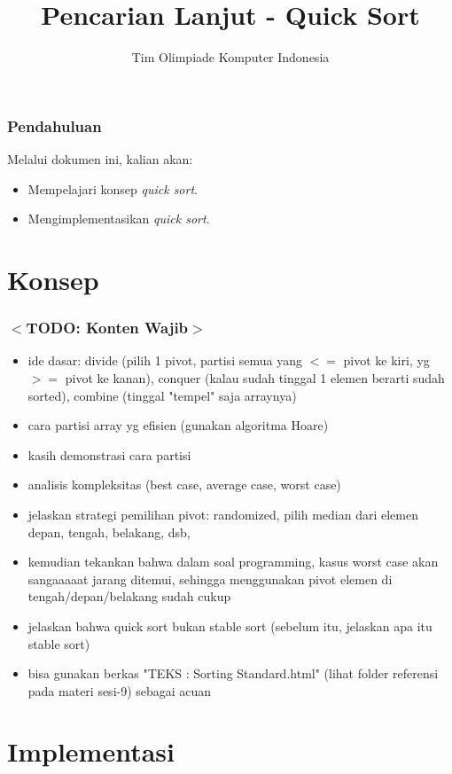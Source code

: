 \documentclass{beamer}
\title{Pencarian Lanjut - Quick Sort}
\author{Tim Olimpiade Komputer Indonesia}
\begin{document}
\begin{frame}
\titlepage
\end{frame}

\begin{frame}
\frametitle{Pendahuluan}
Melalui dokumen ini, kalian akan:
\begin{itemize}
	\item Mempelajari konsep \textit{quick sort}.
	\item Mengimplementasikan \textit{quick sort}.
\end{itemize}
\end{frame}

\section{Konsep}
\frame{\sectionpage}

\begin{frame}
\frametitle{$<$TODO: Konten Wajib$>$}
\begin{itemize}
	\item ide dasar: divide (pilih 1 pivot, partisi semua yang $<=$ pivot ke kiri, yg $>=$ pivot ke kanan), conquer (kalau sudah tinggal 1 elemen berarti sudah sorted), combine (tinggal "tempel" saja arraynya)
	\item cara partisi array yg efisien (gunakan algoritma Hoare)
	\item kasih demonstrasi cara partisi
	\item analisis kompleksitas (best case, average case, worst case)
	\item jelaskan strategi pemilihan pivot: randomized, pilih median dari elemen {depan, tengah, belakang}, dsb,
	\item kemudian tekankan bahwa dalam soal programming, kasus worst case akan sangaaaaat jarang ditemui, sehingga menggunakan pivot elemen di tengah/depan/belakang sudah cukup
	\item jelaskan bahwa quick sort bukan stable sort (sebelum itu, jelaskan apa itu stable sort)
	\item bisa gunakan berkas "TEKS : Sorting Standard.html" (lihat folder referensi pada materi sesi-9) sebagai acuan
\end{itemize}
\end{frame}

\section{Implementasi}
\frame{\sectionpage}
\end{document}
